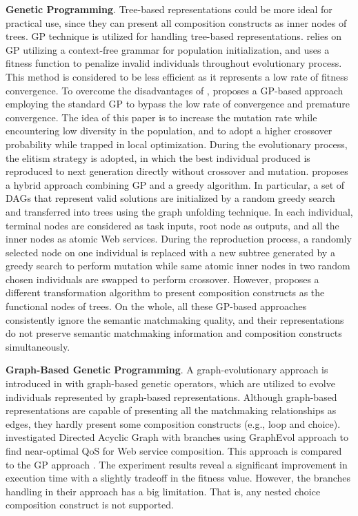 \textbf{Genetic Programming}.
Tree-based representations could be more ideal for practical use, since they can present all composition constructs as inner nodes of trees. GP technique is utilized for handling tree-based representations. \cite {rodriguez2010composition} relies on GP utilizing a context-free grammar for population initialization, and uses a fitness function to penalize invalid individuals throughout evolutionary process. This method is considered to be less efficient as it represents a low rate of fitness convergence. To overcome the disadvantages of \cite {rodriguez2010composition}, \cite{yu2013adaptive} proposes a GP-based approach employing the standard GP to bypass the low rate of convergence and premature convergence. The idea of this paper is to increase the mutation rate while encountering low diversity in the population, and to adopt a higher crossover probability while trapped in local optimization.  During the evolutionary process, the elitism strategy is adopted, in which the best individual produced is reproduced to next generation directly without crossover and mutation. \cite{ma2015hybrid} proposes a hybrid approach combining GP and a greedy algorithm. In particular, a set of DAGs that represent valid solutions are initialized by a random greedy search and transferred into trees using the graph unfolding technique.  In each individual,  terminal nodes are considered as task inputs,  root node as  outputs, and all the inner nodes as atomic Web services. During the reproduction process,  a randomly selected node on one individual is replaced with a new subtree generated by a greedy search to perform mutation while same atomic inner nodes in two random chosen individuals are swapped to perform crossover. However, \cite{da2016genetic} proposes a different transformation algorithm to present composition constructs as the functional nodes of trees. On the whole, all these GP-based approaches \cite{ma2015hybrid,rodriguez2010composition,da2016genetic,yu2013adaptive} consistently ignore the semantic matchmaking quality, and their representations do not preserve semantic matchmaking information and composition constructs simultaneously. 

\textbf{Graph-Based Genetic Programming}.
A graph-evolutionary approach is introduced in \cite{da2015graphevol} with graph-based genetic operators, which are utilized to evolve individuals represented by graph-based representations. Although graph-based representations are capable of presenting all the matchmaking relationships as edges, they hardly present some composition constructs (e.g., loop and choice). \cite{da2016handling} investigated Directed Acyclic Graph with branches using GraphEvol approach \cite{da2015graphevol} to find near-optimal QoS for Web service composition. This approach is compared to the GP approach \cite{da2015gp}. The experiment results reveal a significant improvement in execution time with a slightly tradeoff in the fitness value. However, the branches handling in their approach has a big limitation. That is, any nested choice composition construct is not supported.

